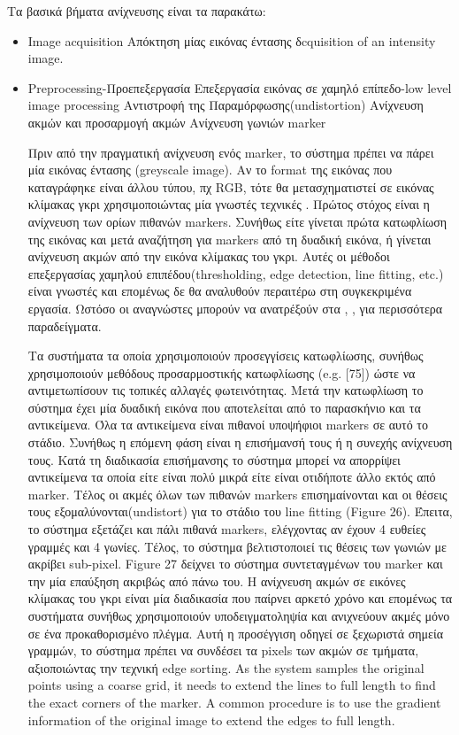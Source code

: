 Τα βασικά βήματα ανίχνευσης είναι τα παρακάτω:
\begin{itemize}


\item Image acquisition
Απόκτηση μίας εικόνας έντασης
δcquisition of an intensity image.
\item Preprocessing-Προεπεξεργασία
Επεξεργασία εικόνας σε χαμηλό επίπεδο-low level image processing
Αντιστροφή της Παραμόρφωσης(undistortion)
Ανίχνευση ακμών και προσαρμογή ακμών
Ανίχνευση γωνιών marker

Πριν από την πραγματική ανίχνευση ενός marker, το σύστημα πρέπει να πάρει μία εικόνας έντασης (greyscale image). Aν το format της εικόνας που καταγράφηκε είναι άλλου τύπου, πχ RGB, τότε θα μετασχηματιστεί σε εικόνας κλίμακας γκρι χρησιμοποιώντας μία γνωστές τεχνικές \cite{Gonzalez}. 
Πρώτος στόχος είναι η ανίχνευση των ορίων πιθανών markers. Συνήθως είτε γίνεται πρώτα κατωφλίωση της εικόνας και μετά αναζήτηση για markers από τη δυαδική εικόνα, ή γίνεται ανίχνευση ακμών από την εικόνα κλίμακας του γκρι. Αυτές οι μέθοδοι επεξεργασίας χαμηλού επιπέδου(thresholding,
edge detection, line fitting, etc.) είναι γνωστές και επομένως δε θα αναλυθούν περαιτέρω στη συγκεκριμένα εργασία. Ωστόσο οι αναγνώστες μπορούν να ανατρέξούν στα \cite{Gonzalez}, \cite{szeliski2010computer}, για περισσότερα παραδείγματα.

Τα συστήματα τα οποία χρησιμοποιούν προσεγγίσεις κατωφλίωσης, συνήθως χρησιμοποιούν μεθόδους προσαρμοστικής κατωφλίωσης (e.g. [75]) ώστε να αντιμετωπίσουν τις τοπικές αλλαγές φωτεινότητας. Μετά την κατωφλίωση το σύστημα έχει μία δυαδική εικόνα που αποτελείται από το παρασκήνιο και τα αντικείμενα. Όλα τα αντικείμενα είναι πιθανοί υποψήφιοι markers σε αυτό το στάδιο. Συνήθως η επόμενη φάση είναι η επισήμανσή τους ή η συνεχής ανίχνευση τους. Κατά τη διαδικασία επισήμανσης το σύστημα μπορεί να απορρίψει αντικείμενα τα οποία είτε είναι πολύ μικρά είτε είναι οτιδήποτε άλλο εκτός από marker. Τέλος οι ακμές όλων των πιθανών markers επισημαίνονται και οι θέσεις τους εξομαλύνονται(undistort) για το στάδιο του line fitting (Figure 26). Έπειτα, το σύστημα εξετάζει και πάλι πιθανά markers, ελέγχοντας αν έχουν 4 ευθείες γραμμές και 4 γωνίες. Τέλος, το σύστημα βελτιστοποιεί τις θέσεις των γωνιών με ακρίβει sub-pixel. Figure 27 δείχνει το σύστημα συντεταγμένων του marker και την μία επαύξηση ακριβώς από πάνω του.
Η ανίχνευση ακμών σε εικόνες κλίμακας του γκρι είναι μία διαδικασία που παίρνει αρκετό χρόνο και επομένως τα συστήματα συνήθως χρησιμοποιούν υποδειγματοληψία και ανιχνεύουν ακμές μόνο σε ένα προκαθορισμένο πλέγμα. Αυτή η προσέγγιση οδηγεί σε ξεχωριστά σημεία γραμμών, το σύστημα πρέπει να συνδέσει τα pixels των ακμών σε τμήματα, αξιοποιώντας την τεχνική edge sorting. As the system samples the
original points using a coarse grid, it needs to extend the lines to full length to find the exact corners of the marker. A common procedure is to use the gradient  information of the original image to extend the edges to full length.


\end{itemize}
